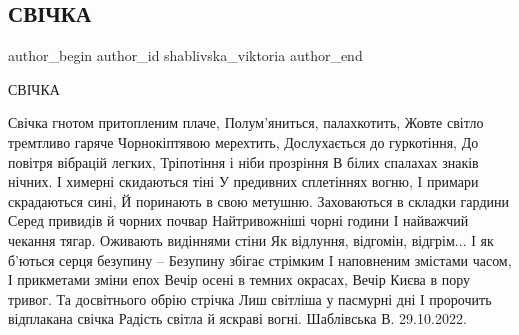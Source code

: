  
 
 
 
 
 
\subsection{СВІЧКА}
\label{sec:29_11_2022.fb.shablivska_viktoria.1.svichka}
 
\ifcmt
 author_begin
   author_id shablivska_viktoria
 author_end
\fi

СВІЧКА

\obeycr
Свічка гнотом притопленим плаче,
Полум'яниться, палахкотить,
Жовте світло тремтливо гаряче
Чорнокіптявою мерехтить,
Дослухається до гуркотіння,
До повітря вібрацій легких, 
Тріпотіння і ніби прозріння
В білих спалахах знаків нічних. 
І химерні скидаються тіні
У предивних сплетіннях вогню,
І примари скрадаються сині,
Й поринають в свою метушню. 
Заховаються в складки гардини
Серед привидів й чорних почвар
Найтривожніші чорні години
І найважчий чекання тягар.
Оживають видіннями стіни
Як відлуння, відгомін, відгрім... 
І як б'ються серця безупину –
Безупину збігає стрімким
І наповненим змістами часом,
І прикметами зміни епох
Вечір осені в темних окрасах,
Вечір Києва в пору тривог.
Та досвітнього обрію стрічка 
Лиш світліша у пасмурні дні
І пророчить відплакана свічка
Радість світла й яскраві вогні.
\smallskip
Шаблівська В.  29.10.2022.
\restorecr

